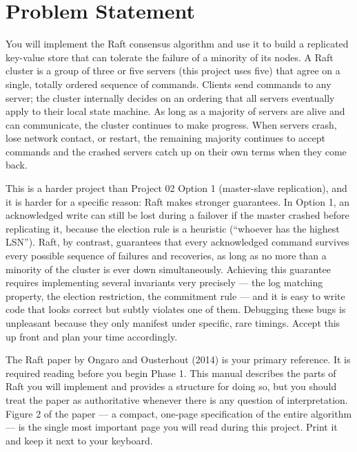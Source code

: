 \documentclass[11pt,a4paper]{article}
\begin{document}

\section{Problem Statement}

You will implement the Raft consensus algorithm and use it to build a replicated key-value store that can tolerate the failure of a minority of its nodes. A Raft cluster is a group of three or five servers (this project uses five) that agree on a single, totally ordered sequence of commands. Clients send commands to any server; the cluster internally decides on an ordering that all servers eventually apply to their local state machine. As long as a majority of servers are alive and can communicate, the cluster continues to make progress. When servers crash, lose network contact, or restart, the remaining majority continues to accept commands and the crashed servers catch up on their own terms when they come back.

This is a harder project than Project 02 Option 1 (master-slave replication), and it is harder for a specific reason: Raft makes stronger guarantees. In Option 1, an acknowledged write can still be lost during a failover if the master crashed before replicating it, because the election rule is a heuristic (``whoever has the highest LSN''). Raft, by contrast, guarantees that every acknowledged command survives every possible sequence of failures and recoveries, as long as no more than a minority of the cluster is ever down simultaneously. Achieving this guarantee requires implementing several invariants very precisely --- the log matching property, the election restriction, the commitment rule --- and it is easy to write code that looks correct but subtly violates one of them. Debugging these bugs is unpleasant because they only manifest under specific, rare timings. Accept this up front and plan your time accordingly.

The Raft paper by Ongaro and Ousterhout (2014) is your primary reference. It is required reading before you begin Phase 1. This manual describes the parts of Raft you will implement and provides a structure for doing so, but you should treat the paper as authoritative whenever there is any question of interpretation. Figure 2 of the paper --- a compact, one-page specification of the entire algorithm --- is the single most important page you will read during this project. Print it and keep it next to your keyboard.
\end{document}
